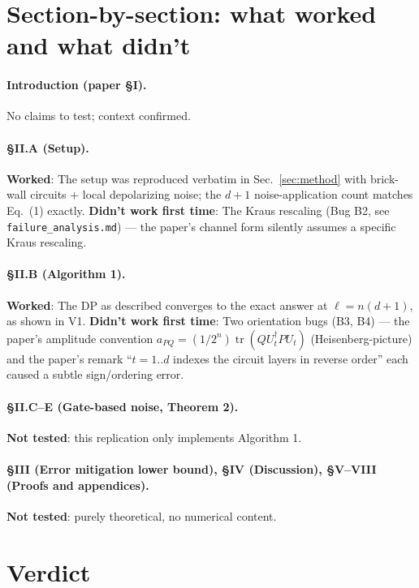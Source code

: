 \documentclass[11pt]{article}
\begin{document}
\section{Section-by-section: what worked and what didn't}
\label{sec:section-by-section}

\paragraph{Introduction (paper \S I).} No claims to test; context confirmed.

\paragraph{\S II.A (Setup).} \textbf{Worked}: The setup was reproduced verbatim in
Sec.~\ref{sec:method} with brick-wall circuits + local depolarizing noise; the
$d{+}1$ noise-application count matches Eq.~(1) exactly.
\textbf{Didn't work first time}: The Kraus rescaling (Bug B2, see
\texttt{failure\_analysis.md}) --- the paper's channel form silently assumes a specific
Kraus rescaling.

\paragraph{\S II.B (Algorithm 1).}  \textbf{Worked}: The DP as described converges to
the exact answer at $\ell=n(d{+}1)$, as shown in V1.  \textbf{Didn't work first time}:
Two orientation bugs (B3, B4) --- the paper's amplitude convention
$a_{PQ}=(1/2^n)\operatorname{tr}(Q U_t^\dagger P U_t)$ (Heisenberg-picture) and the
paper's remark ``$t=1..d$ indexes the circuit layers in reverse order'' each caused a
subtle sign/ordering error.

\paragraph{\S II.C--E (Gate-based noise, Theorem 2).}  \textbf{Not tested}: this
replication only implements Algorithm 1.

\paragraph{\S III (Error mitigation lower bound), \S IV (Discussion), \S V--VIII (Proofs
and appendices).}  \textbf{Not tested}: purely theoretical, no numerical content.

\section{Verdict}
\end{document}
